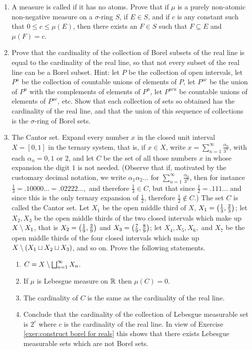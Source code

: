 \begin{enumerate}[label=\arabic*),ref=\arabic*]
\item\label{exer:non atomic measure}
A measure is called  if it has no atoms. Prove that if $\mu$ is a purely non-atomic non-negative measure on a $\sigma$-ring $S$, if $E \in S$, and if $c$ is any constant such that $0 \leq c\leq \mu(E)$, then there exists an $F \in S$ such that $F \subseteq E$ and $\mu(F)=c$.

\item\label{exer:construct borel for reals}
Prove that the cardinality of the collection of Borel subsets of the real line is equal to the cardinality of the real line, so that not every subset of the real line can be a Borel subset. Hint: let $P$ be the collection of open intervals, let $P^u$ be the collection of countable unions of elements of $P$, let $P^{uc}$ be the union of $P^u$ with the complements of elements of $P^u$, let $P^{ucu}$ be countable unions of elements of $P^{uc}$, etc. Show that each collection of sets so obtained has the cardinality of the real line, and that the union of this sequence of collections is the $\sigma$-ring of Borel sets.

\item\label{exer:cantor set}
The Cantor set. Expand every number $x$ in the closed unit interval $X=[0,1]$ in the ternary system, that is, if $x\in X$, write $x=\sum_{n=1}^\infty\frac{\alpha_n}{3^n}$, with each $\alpha_n=0,1$ or $2$, and let $C$ be the set of all those numbers $x$ in whose expansion the digit $1$ is not needed. (Observe that if, motivated by the customary decimal notation, we write $\alpha_1\alpha_2\dots$ for $\sum_{n=1}^\infty\frac{\alpha_n}{3^n}$, then for instance $\frac13=.10000\dots=.02222\dots,$ and therefore $\frac13\in C$, but that since $\frac12=.111\dots$ and since this is the only ternary expansion of $\frac12$, therefore $\frac12\notin C$.) The set $C$ is called the Cantor set. Let $X_1$ be the open middle third of $X$, $X_1=\left(\frac13,\frac23\right)$; let $X_2,X_3$ be the open middle thirds of the two closed intervals which make up $X\setminus X_1$, that is $X_2=\left(\frac19,\frac29\right)$ and $X_3=\left(\frac79,\frac89\right)$; let $X_4,X_5,X_6,$ and $X_7$ be the open middle thirds of the four closed intervals which make up $X\setminus(X_1\sqcup X_2\sqcup X_3)$, and so on. Prove the following statements.
\begin{enumerate}
\item $C=X\setminus\bigsqcup_{n=1}^\infty X_n$.
\item If $\mu$ is Lebesgue measure on $\mathbb{R}$ then $\mu(C)=0$.
\item The cardinality of $C$ is the same as the cardinality of the real line.
\item Conclude that the cardinality of the collection of Lebesgue measurable set is $2^c$ where $c$ is the cardinality of the real line. In view of Exercise \ref{exer:construct borel for reals} this shows that there exists Lebesgue measurable sets which are not Borel sets.
\end{enumerate}


\end{enumerate}

